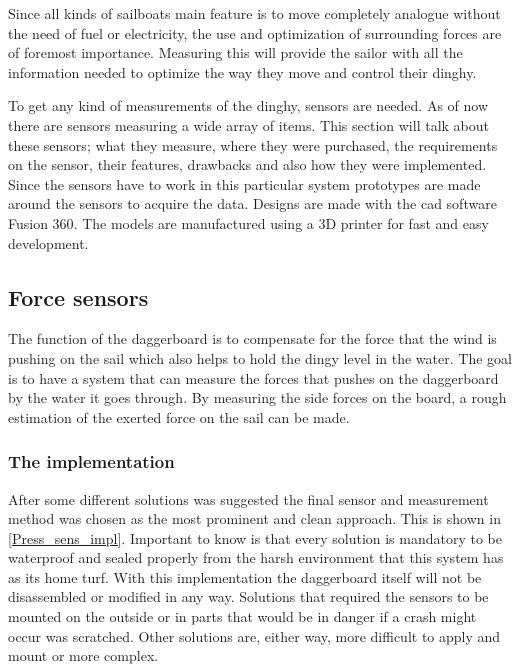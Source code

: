 
Since all kinds of sailboats main feature is to move completely analogue without the need of fuel or electricity, the use and optimization of surrounding forces are of foremost importance. Measuring this will provide the sailor with all the information needed to optimize the way they move and control their dinghy.

To get any kind of measurements of the dinghy, sensors are needed. As of now there are sensors measuring a wide array of items. This section will talk about these sensors; what they measure, where they were purchased, the requirements on the sensor, their features, drawbacks and also how they were implemented.
Since the sensors have to work in this particular system prototypes are made around the sensors to acquire the data.
Designs are made with the \gls{cad} software Fusion 360\cite{cad}. The models are manufactured using a 3D printer for fast and easy development.

\subsection{Force sensors}
The function of the daggerboard is to compensate for the force that the wind is pushing on the sail which also helps to hold the dingy level in the water. The goal is to have a system that can measure the forces that pushes on the daggerboard by the water it goes through. By measuring the side forces on the board, a rough estimation of the exerted force on the sail can be made. 


\subsubsection{The implementation}
After some different solutions was suggested the final sensor and measurement method was chosen as the most prominent and clean approach. This is shown in \autoref{Press_sens_impl}.
Important to know is that every solution is mandatory to be waterproof and sealed properly from the harsh environment that this system has as its home turf. 
With this implementation the daggerboard itself will not be disassembled or modified in any way. 
Solutions that required the sensors to be mounted on the outside or in parts that would be in danger if a crash might occur was scratched.  
Other solutions are, either way, more difficult to apply and mount or more complex.  

